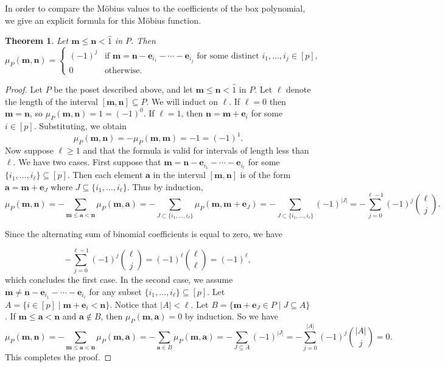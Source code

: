 \documentclass[a4paper, 11pt]{amsart}
\newtheorem{theorem}{Theorem}[section]
\theoremstyle{definition}
\newcommand{\bfm}{\mathbf{m}}
\newcommand{\bfn}{\mathbf{n}}
\newcommand{\bfa}{\mathbf{a}}
\newcommand{\bfe}{\mathbf{e}}
\begin{document}
In order to compare the M\"obius values to the coefficients of the box polynomial, we give an explicit formula for this M\"obius function. 
\begin{theorem}\label{thm:mobius intervals} Let $\bfm \le \bfn < \hat{1}$ in $P$. Then  \[\mu_P(\bfm,\bfn) = \begin{cases}
    (-1)^j & \text{if } \bfm = \bfn-\bfe_{i_1}-\cdots - \bfe_{i_j} \text{ for some distinct } i_1, \ldots, i_j \in [p],\\
    0 & \text{otherwise.}
\end{cases}\]
\end{theorem}
\begin{proof}
Let $P$ be the poset described above, and let $\bfm \le \bfn < \hat{1}$ in $P$. Let $\ell$ denote the length of the interval $[\bfm, \bfn] \subseteq P$. We will induct on $\ell$. If $\ell=0$ then $\bfm=\bfn$, so $\mu_P(\bfm, \bfn) = 1 = (-1)^0$. If $\ell = 1$, then $\bfn = \bfm + \bfe_i$ for some $i \in [p]$. Substituting, we obtain $$\mu_P(\bfm, \bfn) = -\mu_P(\bfm, \bfm) = -1 = (-1)^1.$$ Now suppose $\ell \ge 1$ and that the formula is valid for intervals of length less than $\ell$. We have two cases. First suppose that $\bfm = \bfn - \bfe_{i_1} - \cdots - \bfe_{i_{\ell}}$ for some $\{i_1, \ldots, i_{\ell}\} \subseteq [p]$. Then  each element $\bfa$ in the interval $[\bfm, \bfn]$ is of the form $\bfa = \bfm + \bfe_J$ where $J \subseteq \{ i_1,\ldots,i_{\ell}\}$. Thus by induction,
\[\mu_P(\bfm, \bfn) = -\sum_{\bfm \le \bfa < \bfn}\mu_P(\bfm, \bfa) = -\sum_{J \subset \{i_1,\ldots,i_\ell\}}\mu_P(\bfm, \bfm+\bfe_J) = -\sum_{J \subset \{i_1,\ldots,i_\ell\}}(-1)^{|J|}=-\sum_{j=0}^{\ell-1}(-1)^j\binom{\ell}{j}.\]

Since the alternating sum of binomial coefficients is equal to zero, we have 

\[-\sum_{j=0}^{\ell-1}(-1)^j\binom{\ell}{j} =(-1)^\ell\binom{\ell}{\ell} = (-1)^{\ell}, \]
which concludes the first case. In the second case, we assume $\bfm \ne \bfn-\bfe_{i_1}-\cdots-\bfe_{i_\ell}$ for any subset $\{i_1, \ldots, i_\ell\} \subseteq [p]$. Let $A = \{i \in [p] \mid \bfm+\bfe_i < \bfn\}$. Notice that $|A| < \ell$. Let $B = \{\bfm + \bfe_J \in P \mid J \subseteq A\}$. If $\bfm \le \bfa < \bfn$ and $\bfa \notin B$, then $\mu_P(\bfm, \bfa) = 0$ by induction. So we have 
\[\mu_P(\bfm, \bfn) = -\sum_{\bfm\le\bfa<\bfn}\mu_P(\bfm, \bfa) = -\sum_{\bfa\in B}\mu_P(\bfm, \bfa) = -\sum_{J \subseteq A} (-1)^{|J|} = -\sum_{j=0}^{|A|} (-1)^j\binom{|A|}{j} = 0. \]
This completes the proof.
\end{proof}
\end{document}

